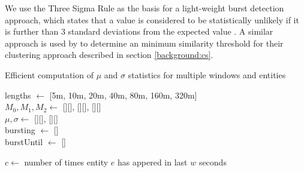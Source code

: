 We use the Three Sigma Rule as the basis for a light-weight burst detection approach, which states that a value is considered to be statistically unlikely if it is further than 3 standard deviations from the expected value \citep{Pukelsheim94}.
A similar approach is used by \cite{Aggarwal12} to determine an minimum similarity threshold for their clustering approach described in section \ref{background:cs}.

\begin{algorithm}[t]
	\caption{Efficient computation of $\mu$ and $\sigma$ statistics for multiple windows and entities}
	\label{detection:alg:updatingEntityValues}

	\DontPrintSemicolon

	lengths $\gets$ [5m, 10m, 20m, 40m, 80m, 160m, 320m]\\
	$M_0, M_1, M_2 \gets$ [][], [][], [][] \\
	$\mu, \sigma \gets$ [][], [][] \\
	bursting $\gets$ [] \\
	burstUntil $\gets$ [] \\

	 {

		 {


			 {
				$c \gets$ number of times entity $e$ has appered in last $w$ seconds \\

			}

		}
	}
\end{algorithm}

